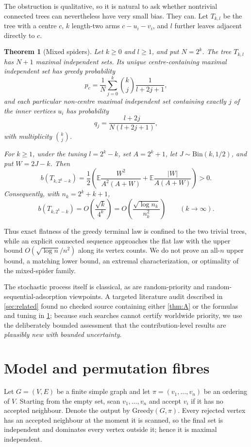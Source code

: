 \documentclass[11pt]{article}
\newtheorem{theorem}{Theorem}[section]
\theoremstyle{definition}
\newcommand{\E}{\mathbb{E}}
\begin{document}
The obstruction is qualitative, so it is natural to ask whether nontrivial connected trees can nevertheless have very small bias.  They can.  Let $T_{k,l}$ be the tree with a centre $c$, $k$ length-two arms $c-u_i-v_i$, and $l$ further leaves adjacent directly to $c$.

\begin{theorem}[Mixed spiders]\label{thm:B}
Let $k\ge0$ and $l\ge1$, and put $N=2^k$.  The tree $T_{k,l}$ has $N+1$ maximal independent sets.  Its unique centre-containing maximal independent set has greedy probability
\[
 p_c=\frac1N\sum_{j=0}^k\binom{k}{j}\frac1{l+2j+1},
\]
and each particular non-centre maximal independent set containing exactly $j$ of the inner vertices $u_i$ has probability
\[
 q_j=\frac{l+2j}{N(l+2j+1)},
\]
with multiplicity $\binom{k}{j}$.

For $k\ge1$, under the tuning $l=2^k-k$, set $A=2^k+1$, let $J\sim\mathrm{Bin}(k,1/2)$, and put $W=2J-k$.  Then
\[
 b(T_{k,2^k-k})
 =\frac12\left(
 \E\frac{W^2}{A^2(A+W)}
 +\E\frac{|W|}{A(A+W)}
 \right)>0.
\]
Consequently, with $n_k=2^k+k+1$,
\[
 b(T_{k,2^k-k})
 =O\!\left(\frac{\sqrt{k}}{4^k}\right)
 =O\!\left(\frac{\sqrt{\log n_k}}{n_k^2}\right)
 \qquad (k\to\infty).
\]
\end{theorem}

Thus exact flatness of the greedy terminal law is confined to the two trivial trees, while an explicit connected sequence approaches the flat law with the upper bound $O(\sqrt{\log n}/n^2)$ along its vertex counts.  We do not prove an all-$n$ upper bound, a matching lower bound, an extremal characterization, or optimality of the mixed-spider family.

The stochastic process itself is classical, as are random-priority and random-sequential-adsorption viewpoints.  A targeted literature audit described in \cref{sec:related} found no checked source containing either \cref{thm:A} or the formulas and tuning in \cref{thm:B}; because such searches cannot certify worldwide priority, we use the deliberately bounded assessment that the contribution-level results are \emph{plausibly new with bounded uncertainty}.

\section{Model and permutation fibres}\label{sec:model}

Let $G=(V,E)$ be a finite simple graph and let $\pi=(v_1,\dots,v_n)$ be an ordering of $V$.  Starting from the empty set, scan $v_1,\dots,v_n$ and accept $v_i$ if it has no accepted neighbour.  Denote the output by $\mathrm{Greedy}(G,\pi)$.  Every rejected vertex has an accepted neighbour at the moment it is scanned, so the final set is independent and dominates every vertex outside it; hence it is maximal independent.
\end{document}
